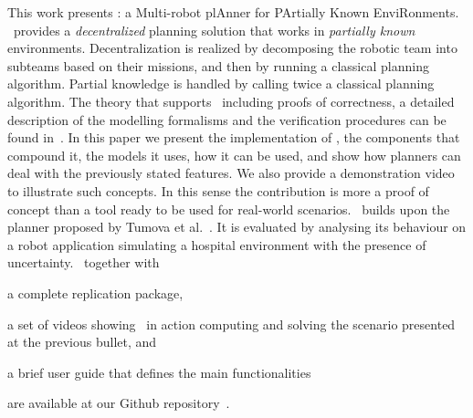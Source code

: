 This work presents  \toolName: a Multi-robot plAnner for PArtially Known EnviRonments.
 \toolName\ provides a  \emph{decentralized} planning solution that works in \emph{partially known} environments.
Decentralization is realized by decomposing the robotic team into subteams based on their missions, and then by running a classical planning algorithm.
Partial knowledge is handled by calling twice a classical planning algorithm.
The theory that supports \toolName\ including proofs of correctness, a detailed description of the modelling formalisms and the verification procedures can be found in~\cite{menghi2018multi}.
In this paper we present the implementation of \toolName, the components that compound it, the models it uses, how it can be used, and  show how planners can deal with the previously stated features. 
We also provide a demonstration video to illustrate such concepts.
In this sense the contribution is more a proof of concept than a tool ready to be used for real-world scenarios.
\toolName~builds upon the planner proposed by Tumova et al.~\cite{tumova2016multi}.
It is evaluated by analysing its behaviour on a robot application simulating a hospital environment with the presence of uncertainty.
\toolName\  together with 
\begin{enumerate*}
\item a complete replication package,
\item a set of videos showing \toolName\ in action computing and solving the scenario presented at the previous bullet, and
\item a brief user guide that defines the main functionalities 
\end{enumerate*}
 are available at our Github repository~\cite{repo}. %



